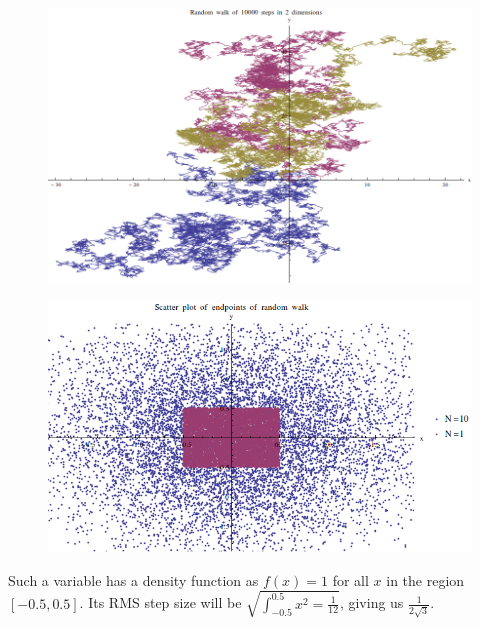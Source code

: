 \documentclass[12pt]{article}
\begin{document}
\begin{figure}[!htb]
\centering
\includegraphics[scale=0.5]{random2lg}
\end{figure}
\begin{figure}[!htb]
\centering
\includegraphics[scale=0.5]{scatter}
\end{figure}

Such a variable has a density function as $f(x) = 1$ for all $x$ in the region $[-0.5, 0.5]$. Its RMS step size will be $\sqrt{\int_{-0.5}^{0.5}x^2=\frac1{12}}$, giving us $\boxed{\frac1{2\sqrt3}}$.
\end{document}
